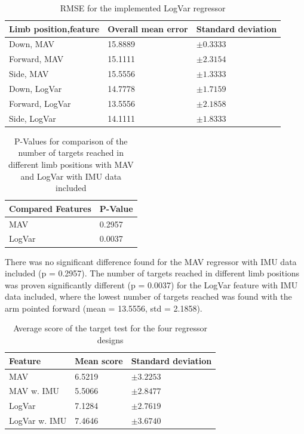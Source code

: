 \documentclass[a4paper, 10pt, conference]{ieeeconf}      %
\begin{document}
\begin{multicol}{2}
	\begin{table}[H]
		\begin{center}
			\begin{tabular}{l l l}
				\hline
				\textbf{Limb position,feature} & \textbf{Overall mean error} & \textbf{Standard deviation}\\
				\hline
				Down, MAV & 15.8889 & $\pm 0.3333$ \\
				Forward, MAV & 15.1111 & $\pm 2.3154$ \\
				Side, MAV & 15.5556 & $\pm 1.3333$ \\
				Down, LogVar & 14.7778 & $\pm 1.7159$ \\
				Forward, LogVar & 13.5556 & $\pm 2.1858$ \\
				Side, LogVar & 14.1111 & $\pm 1.8333$ \\
				\hline
			\end{tabular}
			\caption{RMSE for the implemented LogVar regressor}
		\end{center}
	\end{table}
	
	\begin{table}[H]
		\begin{center}
			\begin{tabular}{l l}
				\hline
				\textbf{Compared Features} & \textbf{P-Value}\\
				\hline
				MAV & 0.2957 \\
				LogVar & 0.0037 \\
				\hline
			\end{tabular}
			\caption{P-Values for comparison of the number of targets reached in different limb positions with MAV and LogVar with IMU data included}
		\end{center}
	\end{table}
	
	There was no significant difference found for the MAV regressor with IMU data included (p = 0.2957). The number of targets reached in different limb positions was proven significantly different (p = 0.0037) for the LogVar feature with IMU data included, where the lowest number of targets reached was found with the arm pointed forward (mean = 13.5556, std = 2.1858).
	
	
	\begin{table}[H]
		\begin{center}
			\begin{tabular}{l l l}
				\hline
				\textbf{Feature} & \textbf{Mean score} & \textbf{Standard deviation}\\
				\hline
				MAV & 6.5219 & $\pm 3.2253$ \\
				MAV w. IMU & 5.5066 & $\pm 2.8477$ \\
				LogVar & 7.1284 & $\pm 2.7619$ \\
				LogVar w. IMU & 7.4646 & $\pm 3.6740$ \\
				\hline
			\end{tabular}
			\caption{Average score of the target test for the four regressor designs}
		\end{center}
	\end{table}
	

\end{multicol}
\end{document}
